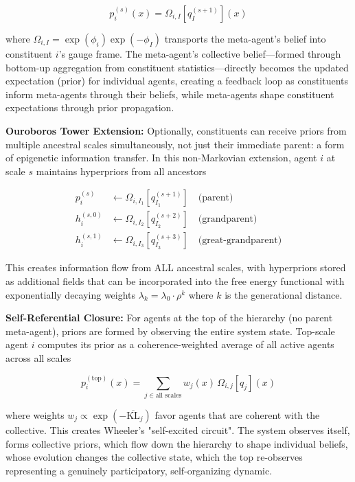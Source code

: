 \documentclass[11pt]{article}
\begin{document}
\begin{equation}
p_i^{(s)}(x) = \Omega_{i,I}[q_I^{(s+1)}](x)
\end{equation}

where $\Omega_{i,I} = \exp(\phi_i)\exp(-\phi_I)$ transports the meta-agent's belief into constituent $i$'s gauge frame. The meta-agent's collective belief—formed through bottom-up aggregation from constituent statistics—directly becomes the updated expectation (prior) for individual agents, creating a feedback loop as constituents inform meta-agents through their beliefs, while meta-agents shape constituent expectations through prior propagation.

\textbf{Ouroboros Tower Extension:} Optionally, constituents can receive priors from multiple ancestral scales simultaneously, not just their immediate parent: a form of epigenetic information transfer. In this non-Markovian extension, agent $i$ at scale $s$ maintains hyperpriors from all ancestors

\begin{align}
p_i^{(s)} &\leftarrow \Omega_{i,I_1}[q_{I_1}^{(s+1)}] \quad \text{(parent)} \\
h_i^{(s,0)} &\leftarrow \Omega_{i,I_2}[q_{I_2}^{(s+2)}] \quad \text{(grandparent)} \\
h_i^{(s,1)} &\leftarrow \Omega_{i,I_3}[q_{I_3}^{(s+3)}] \quad \text{(great-grandparent)}
\end{align}

This creates information flow from ALL ancestral scales, with hyperpriors stored as additional fields that can be incorporated into the free energy functional with exponentially decaying weights $\lambda_k = \lambda_0 \cdot \rho^k$ where $k$ is the generational distance.

\textbf{Self-Referential Closure:} For agents at the top of the hierarchy (no parent meta-agent), priors are formed by observing the entire system state. Top-scale agent $i$ computes its prior as a coherence-weighted average of all active agents across all scales

\begin{equation}
p_i^{(\text{top})}(x) = \sum_{j \in \text{all scales}} w_j(x) \, \Omega_{i,j}[q_j](x)
\end{equation}

where weights $w_j \propto \exp(-\overline{\text{KL}}_j)$ favor agents that are coherent with the collective. This creates Wheeler's "self-excited circuit".  The system observes itself, forms collective priors, which flow down the hierarchy to shape individual beliefs, whose evolution changes the collective state, which the top re-observes representing a genuinely participatory, self-organizing dynamic.
\end{document}
